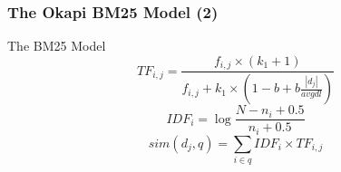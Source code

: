 \documentclass[svgnames]{beamer}
\begin{document}
\begin{frame} \frametitle{The Okapi BM25 Model (2)}
\begin{block}{The BM25 Model}
    \begin{displaymath}
          TF_{i,j} = \frac{f_{i,j} \times (k_1 + 1)}
                                  {f_{i,j} + k_1 \times \left( 1-b+b\frac{|d_j|}{avgdl} \right)}
    \end{displaymath}
    \begin{displaymath}
        IDF_i = \log\frac{N - n_i + 0.5}{n_i + 0.5}
    \end{displaymath}
    \begin{displaymath}
          sim(d_j,q) =
          \sum_{i \in q} IDF_i \times TF_{i,j} 
    \end{displaymath}
\end{block}
\end{frame}

\end{document}
